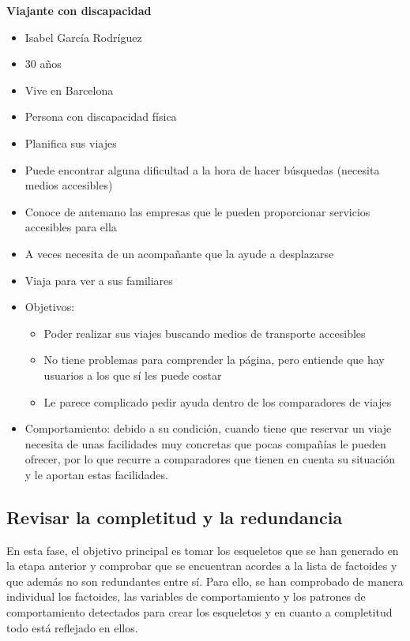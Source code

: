 \noindent \textbf{Viajante con discapacidad}
\begin{itemize}
    \item Isabel García Rodríguez
    \item 30 años
    \item Vive en Barcelona
    \item Persona con discapacidad física
    \item Planifica sus viajes
    \item Puede encontrar alguna dificultad a la hora de hacer búsquedas (necesita medios accesibles)
    \item Conoce de antemano las empresas que le pueden proporcionar servicios accesibles para ella
    \item A veces necesita de un acompañante que la ayude a desplazarse
    \item Viaja para ver a sus familiares
    \item Objetivos:
    \begin{itemize}
        \item Poder realizar sus viajes buscando medios de transporte accesibles
        \item No tiene problemas para comprender la página, pero entiende que hay usuarios a los que sí les puede costar
        \item Le parece complicado pedir ayuda dentro de los comparadores de viajes
    \end{itemize}
    \item Comportamiento: debido a su condición, cuando tiene que reservar un viaje necesita de unas facilidades muy concretas
    que pocas compañías le pueden ofrecer, por lo que recurre a comparadores que tienen en cuenta su situación y le aportan estas
    facilidades.          
\end{itemize}

\subsection{Revisar la completitud y la redundancia}
En esta fase, el objetivo principal es tomar los esqueletos que se han generado en la etapa anterior y comprobar que se encuentran acordes 
a la lista de factoides y que además no son redundantes entre sí. Para ello, se han comprobado de manera individual los factoides, las 
variables de comportamiento y los patrones de comportamiento detectados para crear los esqueletos y en cuanto a completitud todo está 
reflejado en ellos. \\

